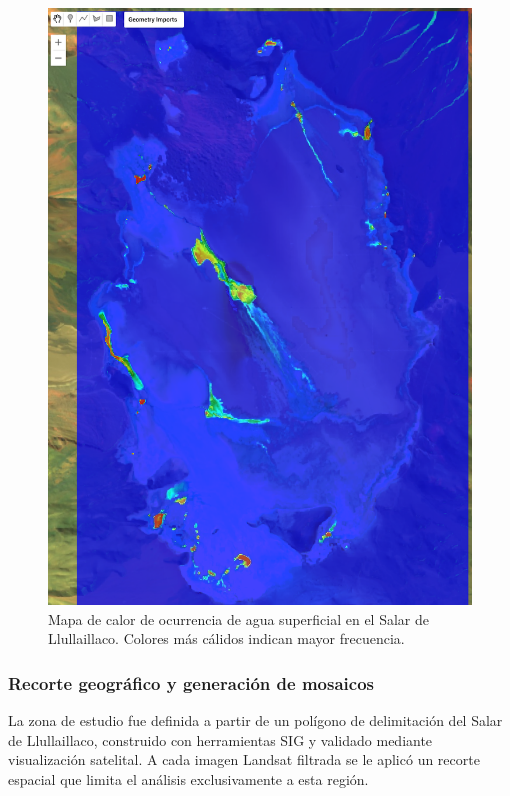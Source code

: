 \begin{figure}[htpb]
	\centering
	\includegraphics[scale=.3]{Figures/fig6.png}
	\caption{Mapa de calor de ocurrencia de agua superficial en el Salar de Llullaillaco. Colores más cálidos indican mayor frecuencia.}
	\label{fig:mapa_ocurrencias}
\end{figure}



\subsubsection*{Recorte geográfico y generación de mosaicos}

La zona de estudio fue definida a partir de un polígono de delimitación del Salar de Llullaillaco, construido con herramientas SIG y validado mediante visualización satelital. A cada imagen Landsat filtrada se le aplicó un recorte espacial que limita el análisis exclusivamente a esta región.


